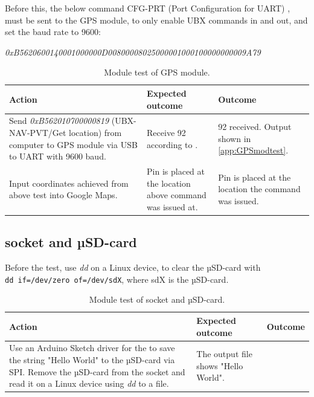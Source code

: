Before this, the below command CFG-PRT (Port Configuration for UART) \cite[p.~119-120]{NEO7_proto}, must be sent to the GPS module, to only enable UBX commands in and out, and set the baud rate to \num{9600}:

\noindent
\textit{0xB5620600140001000000D00800008025000001000100000000009A79}

\begin{table}[H]
	\centering
	\begin{tabularx}{\textwidth}{p{4.3cm} X X}
		\toprule
		\textbf{Action} & \textbf{Expected outcome} & \textbf{Outcome} \\
		\midrule
		Send \textit{0xB562010700000819} (UBX-NAV-PVT/Get location) from computer to GPS module via USB to UART with \num{9600} baud. & Receive \SI{92}{\byte} according to \cite[p.~160-161]{NEO7_proto}. & \SI{92}{\byte} received. Output shown in \cref{app:GPSmodtest}. \\
		\midrule
		Input coordinates achieved from above test into Google Maps. & Pin is placed at the location above command was issued at. & Pin is placed at the location the command was issued. \\
		\bottomrule
	\end{tabularx}
	\caption{Module test of \GPS GPS module.}
	\label{AT:modGPS}
\end{table}

\subsection{\SDsock socket and µSD-card}
Before the test, use \textit{dd} on a Linux device, to clear the µSD-card with \\
\texttt{dd if=/dev/zero of=/dev/sdX}, where sdX is the µSD-card.

\begin{table}[H]
	\centering
	\begin{tabularx}{\textwidth}{p{4.3cm} X X}
		\toprule
		\textbf{Action} & \textbf{Expected outcome} & \textbf{Outcome} \\
		\midrule
		Use an Arduino Sketch driver for the \MKR to save the string "Hello World" to the µSD-card via SPI.
		Remove the µSD-card from the \SDsock socket and read it on a Linux device using \textit{dd} to a file. & The output file shows "Hello World". & \\
		\bottomrule
	\end{tabularx}
	\caption{Module test of \SDsock socket and µSD-card.}
	\label{AT:modSD}
\end{table}

